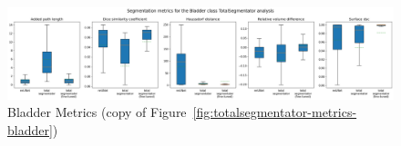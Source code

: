 \documentclass[11pt,twoside]{report}
\begin{document}
\begin{table}[h!]
  \centering
  \caption{Metrics for the Bladder in TotalSegmentator transferral. Statistics are lifted from Figure~\ref{fig:totalsegmentator-metrics-bladder} and Tables~\ref{tab:totalsegmentator-apl}-~\ref{tab:totalsegmentator-sdc}.}\label{tab:totalsegmentator-bladder-transfer-stats}
\end{table}

\begin{figure}[H]
  \centering
  \includegraphics[width=\linewidth]{../../research/source/code/data/metrics/metricsbladder_1_combinednotable_TotalSegmentator_analysis.png}
  \caption{Bladder Metrics (copy of Figure~\ref{fig:totalsegmentator-metrics-bladder})}\label{fig:totalsegmentator-metrics-bladder-copy}
\end{figure}
\end{document}
